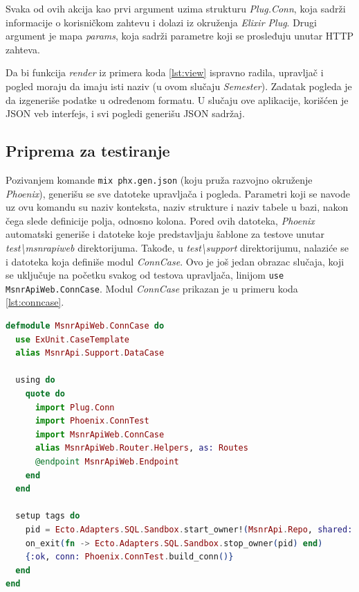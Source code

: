 \documentclass[12pt,oneside]{memoir}
\begin{document}
\par Svaka od ovih akcija kao prvi argument uzima strukturu \emph{Plug.Conn}, koja sadrži informacije o korisničkom zahtevu i dolazi iz okruženja \emph{Elixir Plug}. Drugi argument je mapa \emph{params}, koja sadrži parametre koji se prosleđuju unutar HTTP zahteva.
\par Da bi funkcija \emph{render} iz primera koda \ref{lst:view} ispravno radila, upravljač i pogled moraju da imaju isti naziv (u ovom slučaju \emph{Semester}). Zadatak pogleda je da izgeneriše podatke u određenom formatu. U slučaju ove aplikacije, korišćen je JSON veb interfejs, i svi pogledi generišu JSON sadržaj.

\subsection{Priprema za testiranje}

\par Pozivanjem komande \texttt{mix phx.gen.json} (koju pruža razvojno okruženje \emph{Phoenix}), generišu se sve datoteke upravljača i pogleda. Parametri koji se navode uz ovu komandu su naziv konteksta, naziv strukture i naziv tabele u bazi, nakon čega slede definicije polja, odnosno kolona. Pored ovih datoteka, \emph{Phoenix} automatski generiše i datoteke koje predstavljaju šablone za testove unutar \emph{test{\textbackslash}msnr{\textunderscore}api{\textunderscore}web} direktorijuma. Takođe, u \emph{test{\textbackslash}support} direktorijumu, nalaziće se i datoteka koja definiše modul \emph{ConnCase}. Ovo je još jedan obrazac slučaja, koji se uključuje na početku svakog od testova upravljača, linijom \texttt{use MsnrApiWeb.ConnCase}. Modul \emph{ConnCase} prikazan je u primeru koda \ref{lst:conncase}. \\

\begin{minipage}{\linewidth}
\begin{lstlisting}[language=elixir, basicstyle=\small, caption={Modul \emph{ConnCase}},captionpos=b, label={lst:conncase}]
defmodule MsnrApiWeb.ConnCase do
  use ExUnit.CaseTemplate
  alias MsnrApi.Support.DataCase

  using do
    quote do
      import Plug.Conn
      import Phoenix.ConnTest
      import MsnrApiWeb.ConnCase
      alias MsnrApiWeb.Router.Helpers, as: Routes
      @endpoint MsnrApiWeb.Endpoint
    end
  end

  setup tags do
    pid = Ecto.Adapters.SQL.Sandbox.start_owner!(MsnrApi.Repo, shared: not tags[:async])
    on_exit(fn -> Ecto.Adapters.SQL.Sandbox.stop_owner(pid) end)
    {:ok, conn: Phoenix.ConnTest.build_conn()}
  end
end
\end{lstlisting}
\end{minipage}
\end{document}
